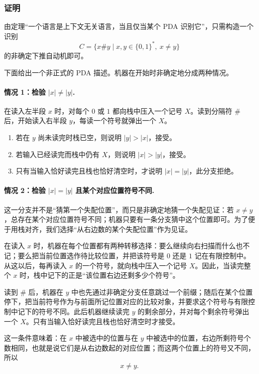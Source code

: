 \begin{answerred}
\subsubsection*{证明}

由定理“一个语言是上下文无关语言，当且仅当某个 PDA 识别它”，只需构造一个识别
\[
    C=\{x\#y\mid x,y\in\{0,1\}^*,\ x\ne y\}
\]
的非确定下推自动机即可。

下面给出一个非正式的 PDA 描述。机器在开始时非确定地分成两种情况。

\paragraph{情况 1：检验 $|x|\ne |y|$.}
在读入左半段 $x$ 时，对每个 $0$ 或 $1$ 都向栈中压入一个记号 $X$。读到分隔符 $\#$ 后，开始读入右半段 $y$，每读一个符号就弹出一个 $X$。

\begin{enumerate}[label=(\roman*), leftmargin=2.5em]
    \item 若在 $y$ 尚未读完时栈已空，则说明 $|y|>|x|$，接受。
    \item 若输入已经读完而栈中仍有 $X$，则说明 $|x|>|y|$，接受。
    \item 只有当输入恰好读完且栈也恰好清空时，才说明 $|x|=|y|$，此分支拒绝。
\end{enumerate}

\paragraph{情况 2：检验 $|x|=|y|$ 且某个对应位置符号不同.}
这一分支并不是“猜第一个失配位置”，而只是非确定地猜一个失配见证：若 $x\ne y$，总存在某个对应位置符号不同；机器只要有一条分支猜中这个位置即可。为了便于用栈对齐，我们选择“从右边数的某个失配位置”作为见证。

在读入 $x$ 时，机器在每个位置都有两种转移选择：要么继续向右扫描而什么也不记；要么把当前位置选作待比较位置，并把该符号是 $0$ 还是 $1$ 记在有限控制中。从这以后，每再读入 $x$ 的一个符号，就向栈中压入一个记号 $X$。因此，当读完整个 $x$ 时，栈中记下的正是“该位置右边还剩多少个符号”。

读到 $\#$ 后，机器在 $y$ 中也先通过非确定分支任意跳过一个前缀；随后在某个位置停下，把当前符号作为与前面所记位置对应的比较对象，并要求这个符号与有限控制中记下的符号不同。此后机器继续读完 $y$ 的剩余部分，并对每个剩余符号弹出一个 $X$。只有当输入恰好读完且栈也恰好清空时才接受。

这一条件意味着：在 $x$ 中被选中的位置与在 $y$ 中被选中的位置，右边所剩符号个数相同，也就是说它们是从右边数起的对应位置；而这两个位置上的符号又不同，所以
\[
    x\ne y.
\]


\end{answerred}
